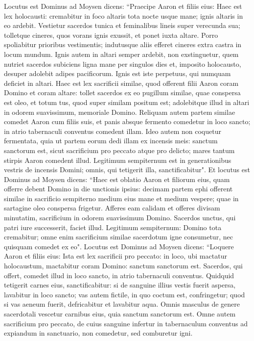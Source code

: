 \begin{biblechapter}  
\verse Locutus est Dominus ad Moysen dicens: 
\verse “Praecipe Aaron et filiis eius: Haec est lex holocausti: cremabitur in foco altaris tota nocte usque mane; ignis altaris in eo ardebit. 
\verse Vestietur sacerdos tunica et feminalibus lineis super verecunda sua; tolletque cineres, quos vorans ignis exussit, et ponet iuxta altare. 
\verse Porro spoliabitur prioribus vestimentis; indutusque aliis efferet cineres extra castra in locum mundum. 
\verse Ignis autem in altari semper ardebit, non exstinguetur, quem nutriet sacerdos subiciens ligna mane per singulos dies et, imposito holocausto, desuper adolebit adipes pacificorum.  
\verse Ignis est iste perpetuus, qui numquam deficiet in altari. 
\verse Haec est lex sacrificii similae, quod offerent filii Aaron coram Domino et coram altare: 
\verse tollet sacerdos ex eo pugillum similae, quae conspersa est oleo, et totum tus, quod super similam positum est; adolebitque illud in altari in odorem suavissimum, memoriale Domino. 
\verse Reliquam autem partem similae comedet Aaron cum filiis suis, et panis absque fermento comedetur in loco sancto; in atrio tabernaculi conventus comedent illam. 
\verse Ideo autem non coquetur fermentata, quia ut partem eorum dedi illam ex incensis meis: sanctum sanctorum est, sicut sacrificium pro peccato atque pro delicto; 
\verse mares tantum stirpis Aaron comedent illud. Legitimum sempiternum est in generationibus vestris de incensis Domini; omnis, qui tetigerit illa, sanctificabitur". 
\verse Et locutus est Dominus ad Moysen dicens: 
\verse “Haec est oblatio Aaron et filiorum eius, quam offerre debent Domino in die unctionis ipsius: decimam partem ephi offerent similae in sacrificio sempiterno medium eius mane et medium vespere; 
\verse quae in sartagine oleo conspersa frigetur. Afferes eam calidam et offeres divisam minutatim, sacrificium in odorem suavissimum Domino. 
\verse Sacerdos unctus, qui patri iure successerit, faciet illud. Legitimum sempiternum: Domino tota cremabitur; 
\verse omne enim sacrificium similae sacerdotum igne consumetur, nec quisquam comedet ex eo". 
\verse Locutus est Dominus ad Moysen dicens: 
\verse “Loquere Aaron et filiis eius: Ista est lex sacrificii pro peccato: in loco, ubi mactatur holocaustum, mactabitur coram Domino: sanctum sanctorum est. 
\verse Sacerdos, qui offert, comedet illud in loco sancto, in atrio tabernaculi conventus. 
\verse Quidquid tetigerit carnes eius, sanctificabitur: si de sanguine illius vestis fuerit aspersa, lavabitur in loco sancto; 
\verse vas autem fictile, in quo coctum est, confringetur; quod si vas aeneum fuerit, defricabitur et lavabitur aqua. 
\verse Omnis masculus de genere sacerdotali vescetur carnibus eius, quia sanctum sanctorum est. 
\verse Omne autem sacrificium pro peccato, de cuius sanguine infertur in tabernaculum conventus ad expiandum in sanctuario, non comedetur, sed comburetur igni. 
\end{biblechapter}

